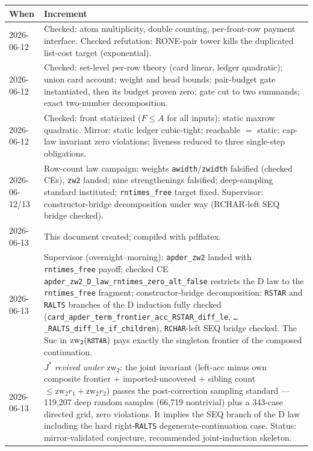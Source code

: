 \documentclass[11pt]{article}
\newcommand{\zw}{\mathrm{zw}}
\newcommand{\code}[1]{\texttt{\small #1}}
\begin{document}
\begin{longtable}{@{}p{}p{}@{}}
\toprule
\textbf{When} & \textbf{Increment} \\
\midrule
\endhead
2026-06-12 & Checked: atom multiplicity, double counting, per-front-row payment interface.  Checked refutation: RONE-pair tower kills the duplicated list-cost target (exponential). \\
2026-06-12 & Checked: set-level per-row theory (card linear, ledger quadratic); union card account; weight and head bounds; pair-budget gate instantiated, then its budget proven zero; gate cut to two summands; exact two-number decomposition. \\
2026-06-12 & Checked: front staticized ($F \le A$ for all inputs); static maxrow quadratic.  Mirror: static ledger cubic-tight; reachable $=$ static; cap-law invariant zero violations; liveness reduced to three single-step obligations. \\
2026-06-12/13 & Row-count law campaign: weights \code{awidth}/\code{zwidth} falsified (checked CEs), \code{zw2} landed; nine strengthenings falsified; deep-sampling standard instituted; \code{rntimes\_free} target fixed.  Supervisor: constructor-bridge decomposition under way (RCHAR-left SEQ bridge checked). \\
2026-06-13 & This document created; compiled with pdflatex. \\
2026-06-13 & Supervisor (overnight--morning): \code{apder\_zw2} landed with \code{rntimes\_free} payoff; checked CE \code{apder\_zw2\_D\_law\_rntimes\_zero\_alt\_false} restricts the D law to the \code{rntimes\_free} fragment; constructor-bridge decomposition: \code{RSTAR} and \code{RALTS} branches of the D induction fully checked (\code{card\_apder\_term\_frontier\_acc\_RSTAR\_diff\_le}, \code{\dots\_RALTS\_diff\_le\_if\_children}), \code{RCHAR}-left SEQ bridge checked.  The $\mathrm{Suc}$ in $\zw_2(\code{RSTAR})$ pays exactly the singleton frontier of the composed continuation. \\
2026-06-13 & $J^*$ \emph{revived under} $\zw_2$: the joint invariant (left-acc minus own composite frontier $+$ imported-uncovered $+$ sibling count $\le \zw_2 r_1 + \zw_2 r_2$) passes the post-correction sampling standard --- 119{,}207 deep random samples (66{,}719 nontrivial) plus a 343-case directed grid, zero violations.  It implies the SEQ branch of the D law including the hard right-\code{RALTS} degenerate-continuation case.  Status: mirror-validated conjecture, recommended joint-induction skeleton. \\

\end{longtable}
\end{document}
